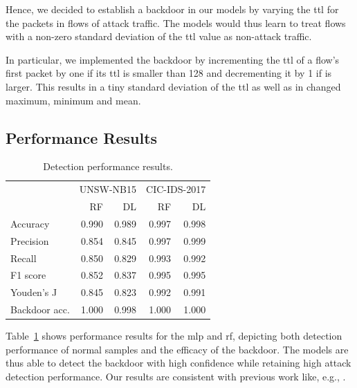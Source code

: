 \documentclass[9pt,sigconf,letterpaper,dvipsnames\ifx\removeHeaders\tempYes ,nonacm\fi]{acmart}
\newcommand{\unsw}{UNSW-NB15}
\newcommand{\cic}{CIC-IDS-2017}
\begin{document}
Hence, we decided to establish a backdoor in our models by varying the \gls{ttl} for the packets in flows of attack traffic. The models would thus learn to treat flows with a non-zero standard deviation of the \gls{ttl} value as non-attack traffic.

In particular, we implemented the backdoor by incrementing the \gls{ttl} of a flow's first packet by one if its \gls{ttl} is smaller than 128 and decrementing it by 1 if is larger. This results in a tiny standard deviation of the \gls{ttl}
as well as in changed maximum, minimum and mean.

\subsection{Performance Results}
\begin{table}[t]
\caption{Detection performance results.} \label{tab:performance_results}
\begin{tabular}{l r r r r} \toprule
& \multicolumn{2}{r}{\unsw{}} & \multicolumn{2}{r}{\cic{}} \\
& RF & DL & RF & DL \\ \midrule
Accuracy	& 0.990 & 0.989 & 0.997 & 0.998\\
Precision	& 0.854 & 0.845 & 0.997 & 0.999\\
Recall	& 0.850 & 0.829 & 0.993 & 0.992\\
F1 score	& 0.852 & 0.837 & 0.995 & 0.995\\
Youden's J	& 0.845 & 0.823 & 0.992 & 0.991\\
Backdoor acc.	& 1.000 & 0.998 & 1.000 & 1.000\\
\bottomrule
\end{tabular}
\end{table}
Table~\ref{tab:performance_results} shows performance results for
the \gls{mlp} and \gls{rf}, depicting both detection performance of normal samples
and the efficacy of the backdoor. The models are thus able to detect the backdoor with high confidence while retaining high attack detection performance.
Our results are consistent with previous work like, e.g., \cite{meghdouri_analysis_2018}.
\end{document}
